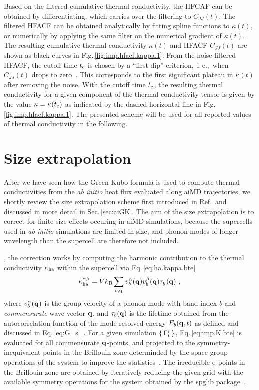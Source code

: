 Based on the filtered cumulative thermal conductivity, the HFCAF can be obtained by differentiating, which carries over the filtering to $C_{JJ} (t)$. The filtered HFACF can be obtained analytically by fitting spline functions to $\kappa (t)$, or numerically by applying the same filter on the numerical gradient of $\kappa (t)$. The resulting cumulative thermal conductivity $\kappa (t)$ and HFACF $C_{JJ} (t)$ are shown as black curves in Fig.\,\ref{fig:imp.hfacf.kappa.1}. From the noise-filtered HFACF, the cutoff time $t_{\rm c}$ is chosen by a ``first dip'' criterion,~i.\,e.,~when $C_{JJ} (t)$ drops to zero~. This corresponds to the first significant plateau in $\kappa (t)$ after removing the noise. With the cutoff time $t_{\rm c}$, the resulting thermal conductivity for a given component of the thermal conductivity tensor is given by the value $\kappa = \kappa (t_{\rm c})$ as indicated by the dashed horizontal line in Fig.\,\ref{fig:imp.hfacf.kappa.1}.
The presented scheme will be used for all reported values of thermal conductivity in the following.

\section{Size extrapolation}
\label{sec:imp.extrapolation}

After we have seen how the Green-Kubo formula is used to compute thermal conductivities from the \emph{ab initio} heat flux evaluated along aiMD trajectories, we shortly review the size extrapolation scheme first introduced in Ref.\,\cite{Carbogno2016} and discussed in more detail in Sec.\,\ref{sec:aiGK}. The aim of the size extrapolation is to correct for finite size effects occuring in aiMD simulations, because the supercells used in \emph{ab initio} simulations are limited in size, and phonon modes of longer wavelength than the supercell are therefore not included. 

, the correction works by computing the harmonic contribution to the thermal conductivity $\kappa_{\rm ha}$ within the supercell via Eq.\,\eqref{eq:ha.kappa.bte}
\begin{align}
	\kappa_{\rm ha}^{\alpha \beta} = V k_{\rm B} \sum_{b, {\bf q}} v^\alpha_b ({\bf q}) v^{\beta}_b ({\bf q}) \fD \tau_b ({\bf q})~,
	\label{eq:imp.K.bte}
\end{align}
where $v_b^\alpha ({\bf q})$ is the group velocity of a phonon mode with band index $b$ and \emph{commensurate} wave vector $\bf q$, and $\tau_b ({\bf q})$ is the lifetime obtained from the autocorrelation function of the mode-resolved energy $E_b ({\bf q}, t)$ as defined and discussed in Eq.\,\eqref{eq:G_s}~\cite{Carbogno2016}. For a given simulation $\set{\Gamma^i  _t}$, Eq.\,\eqref{eq:imp.K.bte} is evaluated for all commensurate $\bf q$-points, and projected to the symmetry-inequivalent points in the Brillouin zone determinded by the space group operations of the system to improve the statistics~\cite{Maradudin1968}. The irreducible q-points in the Brillouin zone are obtained by iteratively reducing the given grid with the available symmetry operations for the system obtained by the spglib package~\cite{Spglib}.

